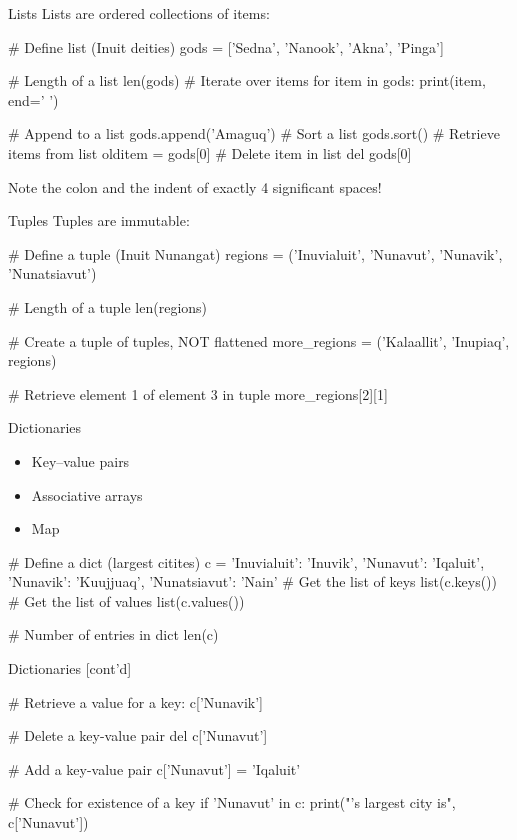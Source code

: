 \documentclass[ignorenonframetext,xcolor=x11names]{beamer}
\begin{document}
\begin{frame}[label=full,fragile]{Lists}
Lists are ordered collections of items:
\begin{pythoncode}
# Define list (Inuit deities)
gods = ['Sedna', 'Nanook', 'Akna', 'Pinga']

# Length of a list
len(gods)
# Iterate over items
for item in gods:
    print(item, end=' ')

# Append to a list
gods.append('Amaguq')
# Sort a list
gods.sort()
# Retrieve items from list
olditem = gods[0]
# Delete item in list
del gods[0]
\end{pythoncode}

Note the colon and the indent of exactly 4 significant spaces!

\end{frame}

\begin{frame}[label=full,fragile]{Tuples}
Tuples are immutable:

\begin{pythoncode}
# Define a tuple (Inuit Nunangat)
regions = ('Inuvialuit', 'Nunavut', 'Nunavik', 'Nunatsiavut')

# Length of a tuple
len(regions)

# Create a tuple of tuples, NOT flattened
more_regions = ('Kalaallit', 'Inupiaq', regions)

# Retrieve element 1 of element 3 in tuple
more_regions[2][1]
\end{pythoncode}
\end{frame}

\begin{frame}[label=full,fragile]{Dictionaries}
\begin{itemize}
  \item Key--value pairs
  \item Associative arrays
  \item Map
\end{itemize}

\begin{pythoncode}
# Define a dict (largest citites)
c = {
    'Inuvialuit': 'Inuvik',
    'Nunavut': 'Iqaluit',
    'Nunavik': 'Kuujjuaq',
    'Nunatsiavut': 'Nain' 
}
# Get the list of keys
list(c.keys())
# Get the list of values
list(c.values())

# Number of entries in dict
len(c)
\end{pythoncode}
\end{frame}

\begin{frame}[label=full,fragile]{Dictionaries \small [cont'd]}
\begin{pythoncode}
# Retrieve a value for a key:
c['Nunavik']

# Delete a key-value pair
del c['Nunavut']

# Add a key-value pair
c['Nunavut'] = 'Iqaluit'

# Check for existence of a key
if 'Nunavut' in c:
    print("\nNunavut's largest city is", c['Nunavut'])
\end{pythoncode}
\end{frame}
\end{document}
